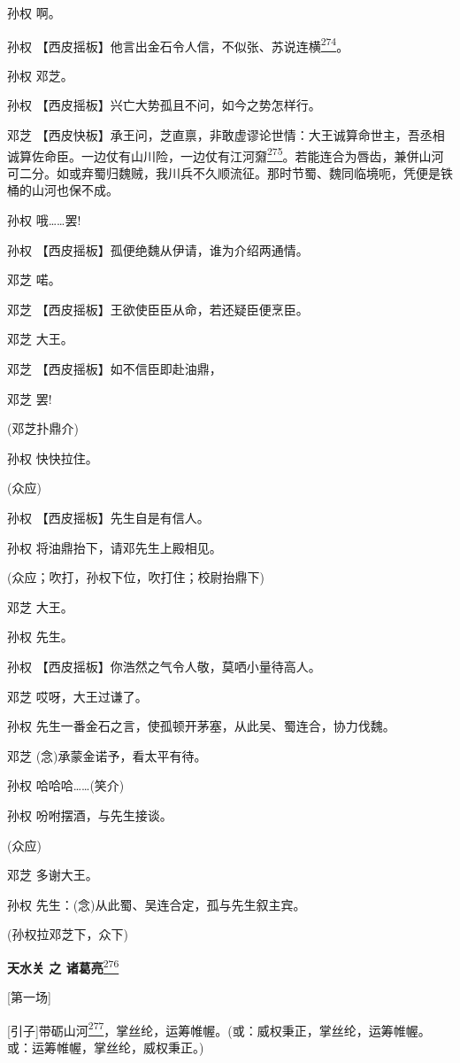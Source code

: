 孙权 啊。

孙权
【西皮摇板】他言出金石令人信，不似张、苏说连横\protect\hyperlink{fn274}{\textsuperscript{274}}。

孙权 邓芝。

孙权 【西皮摇板】兴亡大势孤且不问，如今之势怎样行。

邓芝
【西皮快板】承王问，芝直禀，非敢虚谬论世情：大王诚算命世主，吾丞相诚算佐命臣。一边仗有山川险，一边仗有江河奫\protect\hyperlink{fn275}{\textsuperscript{275}}。若能连合为唇齿，兼併山河可二分。如或弃蜀归魏贼，我川兵不久顺流征。那时节蜀、魏同临境呃，凭便是铁桶的山河也保不成。

孙权 哦\ldots{}\ldots{}罢!

孙权 【西皮摇板】孤便绝魏从伊请，谁为介绍两通情。

邓芝 喏。

邓芝 【西皮摇板】王欲使臣臣从命，若还疑臣便烹臣。

邓芝 大王。

邓芝 【西皮摇板】如不信臣即赴油鼎，

邓芝 罢!

(邓芝扑鼎介)

孙权 快快拉住。

(众应)

孙权 【西皮摇板】先生自是有信人。

孙权 将油鼎抬下，请邓先生上殿相见。

(众应；吹打，孙权下位，吹打住；校尉抬鼎下)

邓芝 大王。

孙权 先生。

孙权 【西皮摇板】你浩然之气令人敬，莫哂小量待高人。

邓芝 哎呀，大王过谦了。

孙权 先生一番金石之言，使孤顿开茅塞，从此吴、蜀连合，协力伐魏。

邓芝 (念)承蒙金诺予，看太平有待。

孙权 哈哈哈\ldots{}\ldots{}(笑介)

孙权 吩咐摆酒，与先生接谈。

(众应)

邓芝 多谢大王。

孙权 先生：(念)从此蜀、吴连合定，孤与先生叙主宾。

(孙权拉邓芝下，众下)

\textbf{天水关 之
诸葛亮}\protect\hyperlink{fn276}{\textsuperscript{276}}

{[}第一场{]}

{[}引子{]}带砺山河\protect\hyperlink{fn277}{\textsuperscript{277}}，掌丝纶，运筹帷幄。(或：威权秉正，掌丝纶，运筹帷幄。或：运筹帷幄，掌丝纶，威权秉正。)

